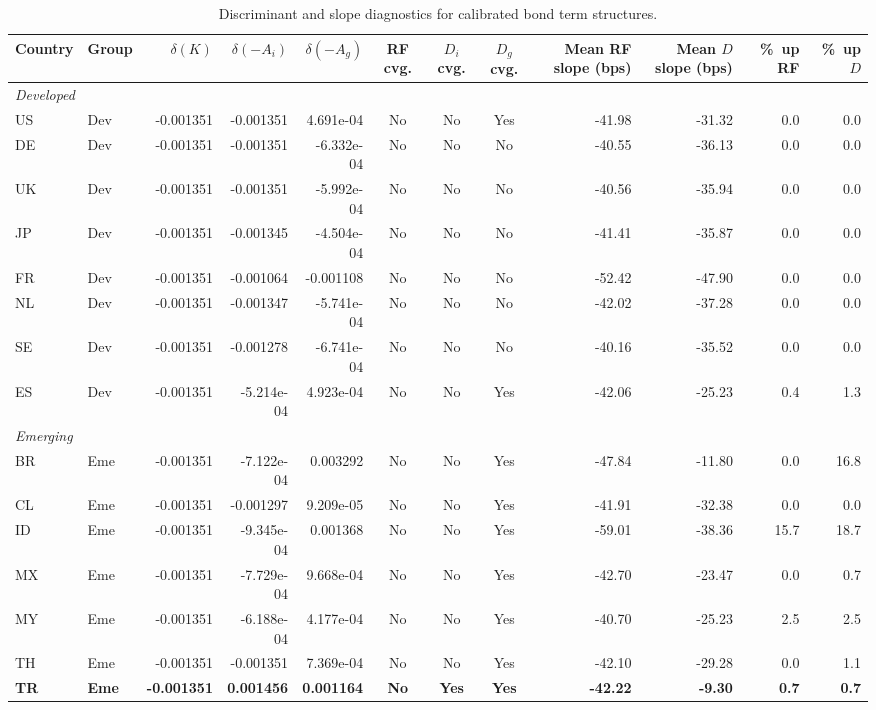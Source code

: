 \begin{table}[H]
\centering
\caption{Discriminant and slope diagnostics for calibrated bond term structures.}
\label{tab:bond_term_structure_diagnostics}
\begin{tabular}{llrrrcccrrrr}
\toprule
Country & Group & $\delta(K)$ & $\delta(-A_i)$ & $\delta(-A_g)$ & RF cvg. & $D_i$ cvg. & $D_g$ cvg. & Mean RF slope (bps) & Mean $D$ slope (bps) & \%\ up RF & \%\ up $D$ \\
\midrule
\multicolumn{12}{l}{\textit{Developed}} \\
\midrule
US & Dev & -0.001351 & -0.001351 & 4.691e-04 & No & No & Yes & -41.98 & -31.32 & 0.0 & 0.0 \\
DE & Dev & -0.001351 & -0.001351 & -6.332e-04 & No & No & No & -40.55 & -36.13 & 0.0 & 0.0 \\
UK & Dev & -0.001351 & -0.001351 & -5.992e-04 & No & No & No & -40.56 & -35.94 & 0.0 & 0.0 \\
JP & Dev & -0.001351 & -0.001345 & -4.504e-04 & No & No & No & -41.41 & -35.87 & 0.0 & 0.0 \\
FR & Dev & -0.001351 & -0.001064 & -0.001108 & No & No & No & -52.42 & -47.90 & 0.0 & 0.0 \\
NL & Dev & -0.001351 & -0.001347 & -5.741e-04 & No & No & No & -42.02 & -37.28 & 0.0 & 0.0 \\
SE & Dev & -0.001351 & -0.001278 & -6.741e-04 & No & No & No & -40.16 & -35.52 & 0.0 & 0.0 \\
ES & Dev & -0.001351 & -5.214e-04 & 4.923e-04 & No & No & Yes & -42.06 & -25.23 & 0.4 & 1.3 \\
\midrule
\multicolumn{12}{l}{\textit{Emerging}} \\
\midrule
BR & Eme & -0.001351 & -7.122e-04 & 0.003292 & No & No & Yes & -47.84 & -11.80 & 0.0 & 16.8 \\
CL & Eme & -0.001351 & -0.001297 & 9.209e-05 & No & No & Yes & -41.91 & -32.38 & 0.0 & 0.0 \\
ID & Eme & -0.001351 & -9.345e-04 & 0.001368 & No & No & Yes & -59.01 & -38.36 & 15.7 & 18.7 \\
MX & Eme & -0.001351 & -7.729e-04 & 9.668e-04 & No & No & Yes & -42.70 & -23.47 & 0.0 & 0.7 \\
MY & Eme & -0.001351 & -6.188e-04 & 4.177e-04 & No & No & Yes & -40.70 & -25.23 & 2.5 & 2.5 \\
TH & Eme & -0.001351 & -0.001351 & 7.369e-04 & No & No & Yes & -42.10 & -29.28 & 0.0 & 1.1 \\
\textbf{TR} & \textbf{Eme} & \textbf{-0.001351} & \textbf{0.001456} & \textbf{0.001164} & \textbf{No} & \textbf{Yes} & \textbf{Yes} & \textbf{-42.22} & \textbf{-9.30} & \textbf{0.7} & \textbf{0.7} \\

\end{tabular}
\end{table}
